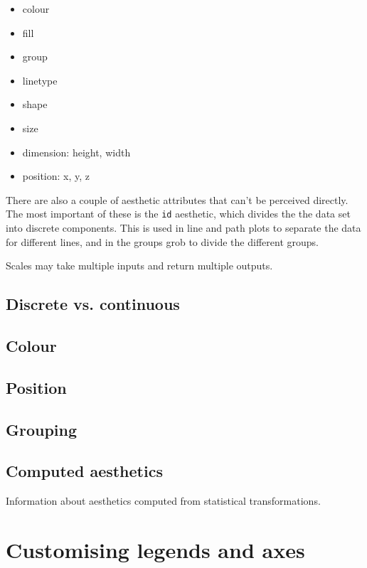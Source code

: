 \begin{itemize}
	\item colour
	\item fill
	\item group
	\item linetype
	\item shape
	\item size
	\item dimension: height, width
	\item position: x, y, z
\end{itemize}

There are also a couple of aesthetic attributes that can't be perceived directly.  The most important of these is the {\tt id} aesthetic, which divides the the data set into discrete components.   This is used in line and path plots to separate the data for different lines, and in the groups grob to divide the different groups. 

Scales may take multiple inputs and return multiple outputs.

\subsection{Discrete vs. continuous}\label{sec:discrete_vs_continuous}
\subsection{Colour}\label{sub:colour}
\subsection{Position}\label{sub:position}
\subsection{Grouping}\label{sub:grouping}


\subsection{Computed aesthetics}\label{sub:computed_aesthetics} 

Information about aesthetics computed from statistical transformations.

\section{Customising legends and axes}\label{sec:customising_legends_and_axes}

